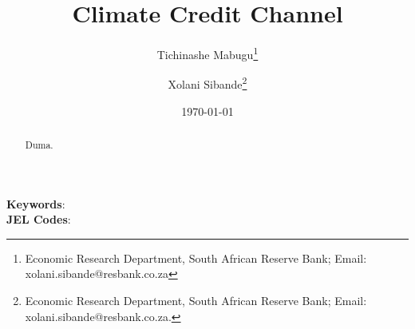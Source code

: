 \title{Climate Credit Channel}





\author {Tichinashe Mabugu\footnote{Economic Research Department, South African Reserve Bank; Email: xolani.sibande@resbank.co.za} \and Xolani Sibande\footnote{Economic Research Department, South African Reserve Bank; Email: xolani.sibande@resbank.co.za.}} 


\date{\today}
\maketitle

\begin{abstract}
Duma.

\end{abstract}

\noindent\textbf{Keywords}: \\
\textbf{JEL Codes}: 
\newpage